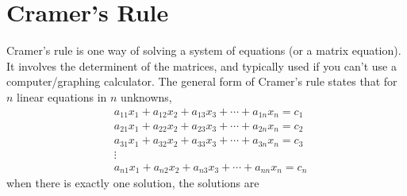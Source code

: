 \documentclass[oneside]{book}
\numberwithin{equation}{chapter} %
\begin{document}
\section{Cramer's Rule}
Cramer's rule is one way of solving a system of equations (or a matrix equation). It involves the determinent of the matrices, and typically used if you can't use a computer/graphing calculator. The general form of Cramer's rule states that for $n$ linear equations in $n$ unknowns,
\begin{align*}
	&a_{11}x_1+a_{12}x_2+a_{13}x_3+\cdots+a_{1n}x_n=c_1\\
	&a_{21}x_1+a_{22}x_2+a_{23}x_3+\cdots+a_{2n}x_n=c_2\\	
	&a_{31}x_1+a_{32}x_2+a_{33}x_3+\cdots+a_{3n}x_n=c_3\\
	&\vdots\\
	&a_{n1}x_1+a_{n2}x_2+a_{n3}x_3+\cdots+a_{nn}x_n=c_n
\end{align*}
when there is exactly one solution, the solutions are 
\end{document}
